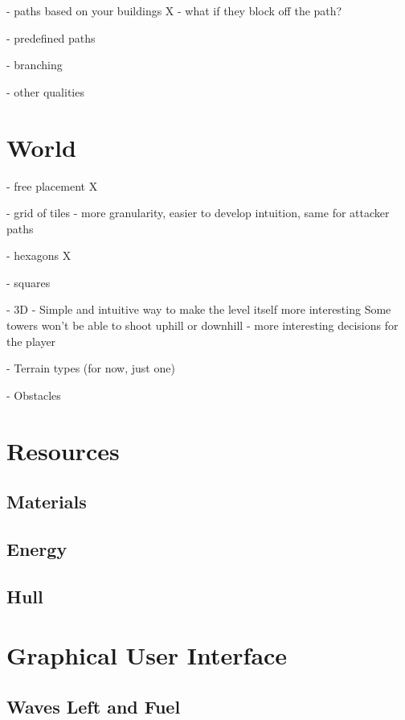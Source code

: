 - paths based on your buildings X
- what if they block off the path?

- predefined paths \checkmark

- branching

- other qualities

\section{World}

- free placement X

- grid of tiles \checkmark
- more granularity, easier to develop intuition, same for attacker paths

- hexagons X

- squares \checkmark

- 3D \checkmark
- Simple and intuitive way to make the level itself more interesting
Some towers won't be able to shoot uphill or downhill - more interesting decisions for the player

- Terrain types (for now, just one)

- Obstacles

\section{Resources}


\subsection{Materials}

\subsection{Energy}

\subsection{Hull}

\section{Graphical User Interface}


\subsection{Waves Left and Fuel}

